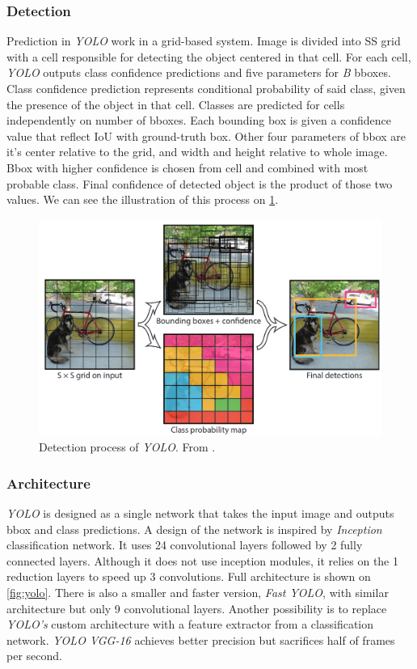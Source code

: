 \subsubsection{Detection}
Prediction in \textit{YOLO} work in a grid-based system. Image is divided into S\x S grid with a cell responsible for detecting the object centered in that cell. For each cell, \textit{YOLO} outputs class confidence predictions and five parameters for \textit{B} bboxes. Class confidence prediction represents conditional probability of said class, given the presence of the object in that cell. Classes are predicted for cells independently on number of bboxes. Each bounding box is given a confidence value that reflect IoU with ground-truth box. Other four parameters of bbox are it's center relative to the grid, and width and height relative to whole image. Bbox with higher confidence is chosen from cell and combined with most probable class. Final confidence of detected object is the product of those two values. We can see the illustration of this process on \cref{fig:yoloDet}.


\begin{figure}
    \centering
    \includegraphics[width=\textwidth]{img/yoloDet}
    \caption{Detection process of \textit{YOLO}. From \cite[fig. 2]{bib:yolo}.}
    \label{fig:yoloDet} 
\end{figure}


\subsubsection{Architecture} 
\textit{YOLO} is designed as a single network that takes the input image and outputs bbox and class predictions. A design of the network is inspired by \textit{Inception} classification network. It uses 24 convolutional layers followed by 2 fully connected layers. Although it does not use inception modules, it relies on the 1 reduction layers to speed up 3 convolutions. Full architecture is shown on \cref{fig:yolo}. There is also a smaller and faster version, \textit{Fast YOLO}, with similar architecture but only 9 convolutional layers. Another possibility is to replace \textit{YOLO's} custom architecture with a feature extractor from a classification network. \textit{YOLO VGG-16} achieves better precision but sacrifices half of frames per second.

